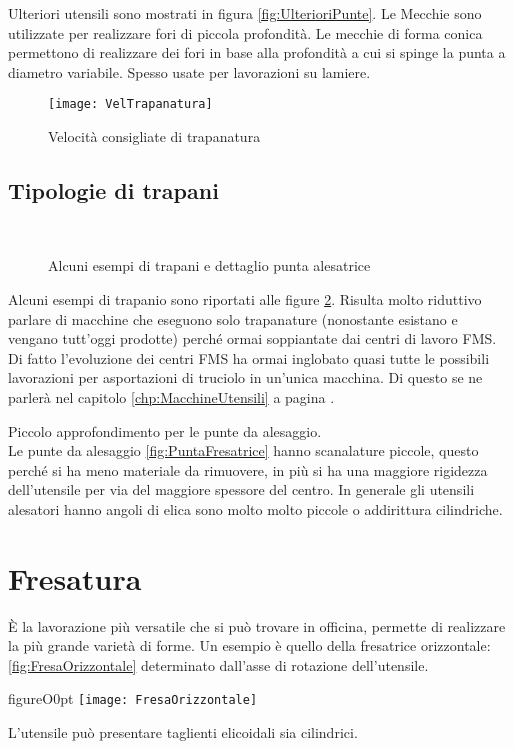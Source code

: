 Ulteriori utensili sono mostrati in figura \ref{fig:UlterioriPunte}.
Le Mecchie sono utilizzate per realizzare fori di piccola profondità.
Le mecchie di forma conica permettono di realizzare dei fori in base alla profondità a cui si spinge la punta
a diametro variabile. Spesso usate per lavorazioni su lamiere.

\begin{figure}
\centering
\texttt{[image: VelTrapanatura]}
\caption{Velocità consigliate di trapanatura}
\label{fig:Veltrapanatura}
\end{figure}

\section{Tipologie di trapani}

\begin{figure}
\centering
{}\quad
{}\\
\caption{Alcuni esempi di trapani e dettaglio punta alesatrice}
\label{fig:Trapani}
\end{figure}
Alcuni esempi di trapanio sono riportati alle figure \ref{fig:Trapani}. Risulta molto riduttivo parlare di macchine che eseguono solo trapanature (nonostante esistano e vengano tutt'oggi prodotte) perché ormai soppiantate dai centri di lavoro \ac{FMS}.
Di fatto l'evoluzione dei centri \ac{FMS} ha ormai inglobato quasi tutte le possibili lavorazioni per asportazioni di truciolo in un'unica macchina.
Di questo se ne parlerà nel capitolo \ref{chp:MacchineUtensili} a pagina \pageref{chp:MacchineUtensili}.

Piccolo approfondimento per le punte da alesaggio.\\
Le punte da alesaggio \ref{fig:PuntaFresatrice} hanno scanalature piccole, questo perché si ha meno materiale da rimuovere, in più si ha una maggiore rigidezza dell'utensile per via del maggiore spessore del centro.
In generale gli utensili alesatori hanno angoli di elica sono molto molto piccole o addirittura cilindriche.

\chapter{Fresatura}\label{chp:Fresatura}
È la lavorazione più versatile che si può trovare in officina, permette di realizzare la più grande varietà di forme.
Un esempio è quello della fresatrice orizzontale: \ref{fig:FresaOrizzontale} determinato dall'asse di rotazione dell'utensile.
\begin{wrapfloat}{figure}{O}{0pt}
\texttt{[image: FresaOrizzontale]}
\caption{Esempio di fresatrice orizzontale}
\label{fig:FresaOrizzontale}
\end{wrapfloat}
L'utensile può presentare taglienti elicoidali sia cilindrici.

